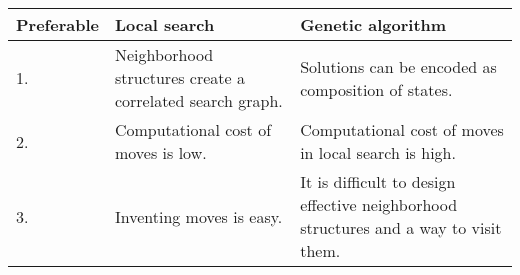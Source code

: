 \begin{table}[h!]
    \centering
    \begin{tabularx}{\textwidth}{|p{2.5cm}|X|X|}
        \hline
        Preferable & \bf Local search & \bf Genetic algorithm \\
        \hline
        1. & Neighborhood structures create a correlated search graph. & Solutions can be encoded as composition of states. \\
        \hline
        2. & Computational cost of moves is low. & Computational cost of moves in local search is high. \\
        \hline
        3. & Inventing moves is easy. & It is difficult to design effective neighborhood structures and a way to visit them. \\
        \hline
    \end{tabularx}
\end{table}